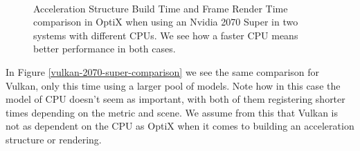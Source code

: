 \begin{figure}
    \\
    \caption{Acceleration Structure Build Time and Frame Render Time comparison in OptiX when using an Nvidia 2070 Super in two systems with different CPUs. We see how a faster CPU means better performance in both cases.}
    \label{optix-2070-super-comparison}
\end{figure}


In Figure \ref{vulkan-2070-super-comparison} we see the same comparison for Vulkan, only this time using a larger pool of models. Note how in this case the model of CPU doesn't seem as important, with both of them registering shorter times depending on the metric and scene. We assume from this that Vulkan is not as dependent on the CPU as OptiX when it comes to building an acceleration structure or rendering.


